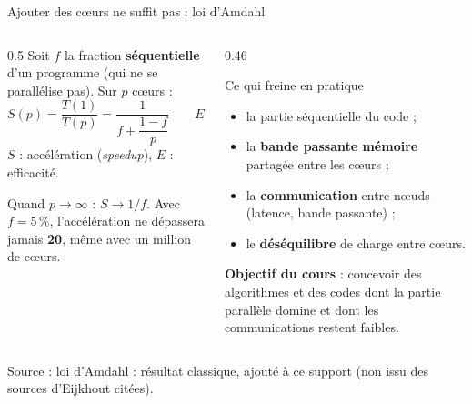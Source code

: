\documentclass[8pt,aspectratio=169]{beamer}
\newcommand{\src}[1]{\vfill{\tiny\color{gray}Source : #1\par}}
\begin{document}
\begin{frame}{Ajouter des cœurs ne suffit pas : loi d'Amdahl}
\begin{columns}[T]
\begin{column}{0.5\textwidth}
Soit $f$ la fraction \textbf{séquentielle} d'un programme (qui ne se parallélise pas). Sur $p$ cœurs :
\[
S(p) = \frac{T(1)}{T(p)} = \frac{1}{f + \dfrac{1-f}{p}}
\qquad
E(p) = \frac{S(p)}{p}
\]
$S$ : accélération (\emph{speedup}), $E$ : efficacité.

\medskip
Quand $p\to\infty$ : $S \to 1/f$. Avec $f = 5\,\%$, l'accélération ne dépassera jamais \textbf{20}, même avec un million de cœurs.
\end{column}
\begin{column}{0.46\textwidth}
\begin{block}{Ce qui freine en pratique}
\begin{itemize}
\item la partie séquentielle du code ;
\item la \textbf{bande passante mémoire} partagée entre les cœurs ;
\item la \textbf{communication} entre nœuds (latence, bande passante) ;
\item le \textbf{déséquilibre} de charge entre cœurs.
\end{itemize}
\end{block}
\textbf{Objectif du cours} : concevoir des algorithmes et des codes dont la partie parallèle domine et dont les communications restent faibles.
\end{column}
\end{columns}
\src{loi d'Amdahl : résultat classique, ajouté à ce support (non issu des sources d'Eijkhout citées).}
\end{frame}
\end{document}
